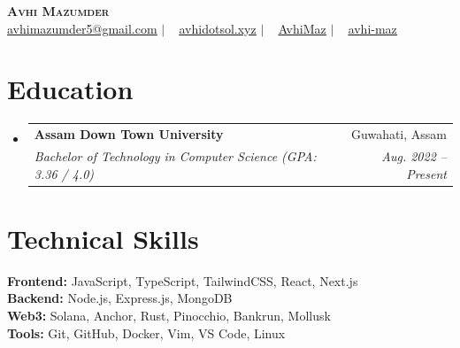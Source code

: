 \documentclass[letterpaper,11pt]{article}
\makeatletter
\newcommand{\resumeSubheading}[4]{
  \vspace{-2pt}\item
    \begin{tabular*}{0.97\textwidth}[t]{l@{\extracolsep{\fill}}r}
      \textbf{#1} & #2 \\
      \textit{\small#3} & \textit{\small #4} \\
    \end{tabular*}\vspace{-7pt}
}
\newcommand{\resumeSubHeadingListStart}{\begin{itemize}[leftmargin=0.15in, label={}]}
\newcommand{\resumeSubHeadingListEnd}{\end{itemize}}
\makeatother
\begin{document}
\begin{center}
  \textbf{\Huge \scshape Avhi Mazumder} \\ \vspace{5pt}
  \small
  \hspace{0.1em}
  \href{mailto:avhimazumder5@gmail.com}{\underline{avhimazumder5@gmail.com}} $|$ \ 
  \hspace{0.1em}
  \href{https://avhidotsol.xyz/}{\underline{avhidotsol.xyz}} $|$ \ 
  \hspace{0.1em}
  \href{https://github.com/AvhiMaz}{\underline{AvhiMaz}} $|$ \ 
  \hspace{0.1em}
  \href{https://www.linkedin.com/in/avhi-maz/}{\underline{avhi-maz}}
\end{center}

\section{Education}
  \resumeSubHeadingListStart

    \resumeSubheading
      {Assam Down Town University}{Guwahati, Assam}
      {Bachelor of Technology in Computer Science \newline\space(GPA: 3.36 / 4.0)}{Aug. 2022 -- Present}

  \resumeSubHeadingListEnd

\section{Technical Skills}
\begin{itemize}[leftmargin=0.15in, label={}]
  \small{\item{
    \textbf{Frontend:} JavaScript, TypeScript, TailwindCSS, React, Next.js \\
    \textbf{Backend:} Node.js, Express.js, MongoDB \\
    \textbf{Web3:} Solana, Anchor, Rust, Pinocchio, Bankrun, Mollusk \\
    \textbf{Tools:} Git, GitHub, Docker, Vim, VS Code, Linux
  }}
\end{itemize}
\end{document}
